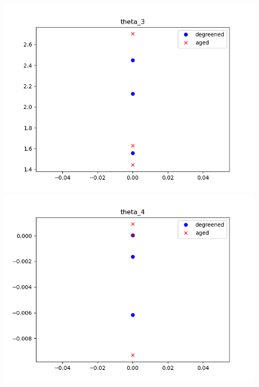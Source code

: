 \begin{figure}[H]
        \begin{minipage}{0.33\textwidth}
                \includegraphics[width = \textwidth]{./figs/figs_new_mdl/theta_3.png}
        \end{minipage}
        \begin{minipage}{0.33\textwidth}
                \includegraphics[width = \textwidth]{./figs/figs_new_mdl/theta_4.png}
        \end{minipage}
        \begin{minipage}{0.33\textwidth}

\end{minipage}
\end{figure}
